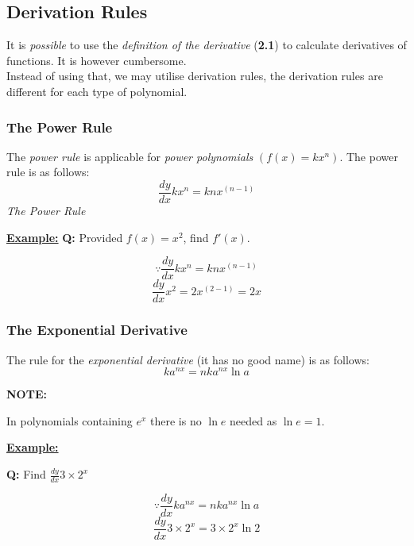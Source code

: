 \documentclass[12pt]{article}
\begin{document}
\subsection{Derivation Rules}
It is \emph{possible} to use the \emph{definition of the derivative} (\textbf{2.1}) to calculate derivatives of functions. It is however cumbersome. \\
Instead of using that, we may utilise derivation rules, the derivation rules are different for each type of polynomial.

\subsubsection{The Power Rule}
The \emph{power rule} is applicable for \emph{power polynomials} $\left( f(x) = kx^n \right)$. The power rule is as follows:
\begin{equation}
	\frac{dy}{dx}kx^n=knx^{(n-1)}
\end{equation}
\emph{The Power Rule} \bigbreak

\begin{BOX}

	\textbf{\underline{Example:}} \bigbreak
	\textbf{Q:} Provided $f(x) = x^2$, find $f'(x)$. \bigbreak
	
		$$\because \frac{dy}{dx} kx^n = knx^{(n-1)}$$
		$$\frac{dy}{dx} x^2 = 2x^{(2-1)} = 2x$$
		
\end{BOX}


\subsubsection{The Exponential Derivative}
The rule for the \emph{exponential derivative} (it has no good name) is as follows:
\begin{equation}
	ka^{nx} = nka^{nx} \ln{a}
\end{equation}
\bigbreak

\textbf{NOTE:} \bigbreak

In polynomials containing $e^x$ there is no $\ln{e}$ needed as $\ln{e}=1$.

\begin{BOX}

	\textbf{\underline{Example:}} \bigbreak

	\textbf{Q:} Find $\frac{dy}{dx} 3 \times 2^x$ 

	$$\because \frac{dy}{dx}ka^{nx} = nka^{nx} \ln{a}$$
	$$\frac{dy}{dx} 3 \times 2^x = 3 \times 2^x \ln{2}$$

\end{BOX} \bigbreak
\end{document}
